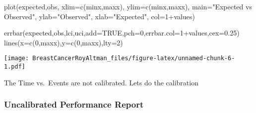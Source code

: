 \documentclass[
]{article}
\newenvironment{Shaded}{\begin{snugshade}}{\end{snugshade}}
\newcommand{\AttributeTok}[1]{\textcolor[rgb]{0.77,0.63,0.00}{#1}}
\newcommand{\ConstantTok}[1]{\textcolor[rgb]{0.00,0.00,0.00}{#1}}
\newcommand{\DecValTok}[1]{\textcolor[rgb]{0.00,0.00,0.81}{#1}}
\newcommand{\FloatTok}[1]{\textcolor[rgb]{0.00,0.00,0.81}{#1}}
\newcommand{\FunctionTok}[1]{\textcolor[rgb]{0.00,0.00,0.00}{#1}}
\newcommand{\NormalTok}[1]{#1}
\newcommand{\SpecialCharTok}[1]{\textcolor[rgb]{0.00,0.00,0.00}{#1}}
\newcommand{\StringTok}[1]{\textcolor[rgb]{0.31,0.60,0.02}{#1}}
\begin{document}
\begin{Shaded}
\begin{Highlighting}[]
\FunctionTok{plot}\NormalTok{(expected,obs,}
     \AttributeTok{xlim=}\FunctionTok{c}\NormalTok{(minx,maxx),}
     \AttributeTok{ylim=}\FunctionTok{c}\NormalTok{(minx,maxx),}
     \AttributeTok{main=}\StringTok{"Expected vs Observed"}\NormalTok{,}
     \AttributeTok{ylab=}\StringTok{"Observed"}\NormalTok{,}
     \AttributeTok{xlab=}\StringTok{"Expected"}\NormalTok{,}
     \AttributeTok{col=}\DecValTok{1}\SpecialCharTok{+}\NormalTok{values)}

\FunctionTok{errbar}\NormalTok{(expected,obs,lci,uci,}\AttributeTok{add=}\ConstantTok{TRUE}\NormalTok{,}\AttributeTok{pch=}\DecValTok{0}\NormalTok{,}\AttributeTok{errbar.col=}\DecValTok{1}\SpecialCharTok{+}\NormalTok{values,}\AttributeTok{cex=}\FloatTok{0.25}\NormalTok{)}
\FunctionTok{lines}\NormalTok{(}\AttributeTok{x=}\FunctionTok{c}\NormalTok{(}\DecValTok{0}\NormalTok{,maxx),}\AttributeTok{y=}\FunctionTok{c}\NormalTok{(}\DecValTok{0}\NormalTok{,maxx),}\AttributeTok{lty=}\DecValTok{2}\NormalTok{)}
\end{Highlighting}
\end{Shaded}

\texttt{[image: BreastCancerRoyAltman\_files/figure-latex/unnamed-chunk-6-1.pdf]}

The Time vs.~Events are not calibrated. Lets do the calibration

\hypertarget{uncalibrated-performance-report}{%
\subsubsection{Uncalibrated Performance
Report}\label{uncalibrated-performance-report}}

\begin{Shaded}
\end{Shaded}
\end{document}
